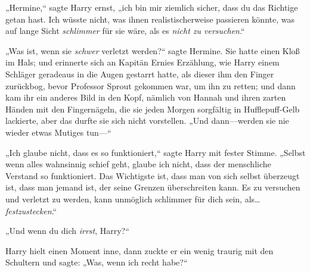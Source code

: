 „Hermine,“ sagte Harry ernst, „ich bin mir ziemlich sicher, dass du das Richtige getan hast. Ich wüsste nicht, was ihnen realistischerweise passieren könnte, was auf lange Sicht \emph{schlimmer} für sie wäre, als es \emph{nicht zu versuchen}.“

„Was ist, wenn sie \emph{schwer} verletzt werden?“ sagte Hermine. Sie hatte einen Kloß im Hals; und erinnerte sich an Kapitän Ernies Erzählung, wie Harry einem Schläger geradeaus in die Augen gestarrt hatte, als dieser ihm den Finger zurückbog, bevor Professor Sprout gekommen war, um ihn zu retten; und dann kam ihr ein anderes Bild in den Kopf, nämlich von Hannah und ihren zarten Händen mit den Fingernägeln, die sie jeden Morgen sorgfältig in Hufflepuff-Gelb lackierte, aber das durfte sie sich nicht vorstellen. „Und dann—werden sie nie wieder etwas Mutiges tun—“

„Ich glaube nicht, dass es so funktioniert,“ sagte Harry mit fester Stimme. „Selbst wenn alles wahnsinnig schief geht, glaube ich nicht, dass der menschliche Verstand so funktioniert. Das Wichtigste ist, dass man von sich selbst überzeugt ist, dass man jemand ist, der seine Grenzen überschreiten kann. Es zu versuchen und verletzt zu werden, kann unmöglich schlimmer für dich sein, als…\emph{festzustecken}.“

„Und wenn du dich \emph{irrst}, Harry?“

Harry hielt einen Moment inne, dann zuckte er ein wenig traurig mit den Schultern und sagte: „Was, wenn ich recht habe?“

